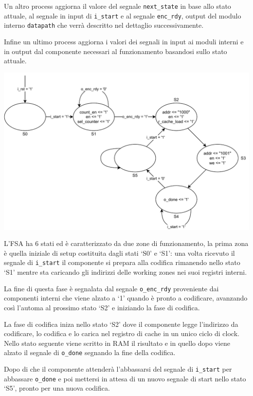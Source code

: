 \documentclass[a4paper,twocolumn]{article}
\begin{document}
Un altro process aggiorna il valore del segnale \texttt{next\_state} in base allo stato attuale, al segnale in input di \texttt{i\_start} e al segnale \texttt{enc\_rdy}, output del modulo interno \texttt{datapath} che verrà descritto nel dettaglio successivamente.

Infine un ultimo process aggiorna i valori dei segnali in input ai moduli interni e in output dal componente necessari al funzionamento basandosi sullo stato attuale.

\includegraphics[width=\linewidth]{schema-fsa.pdf}

L'FSA ha 6 stati ed è caratterizzato da due zone di funzionamento, la prima zona è quella iniziale di setup costituita dagli stati `S0' e `S1': una volta ricevuto il segnale di \texttt{i\_start} il componente si prepara alla codifica rimanendo nello stato `S1' mentre sta caricando gli indirizzi delle working zones nei suoi registri interni.

La fine di questa fase è segnalata dal segnale \texttt{o\_enc\_rdy} proveniente dai componenti interni che viene alzato a `1' quando è pronto a codificare, avanzando così l'automa al prossimo stato `S2' e iniziando la fase di codifica.

La fase di codifica iniza nello stato `S2' dove il componente legge l'indirizzo da codificare, lo codifica e lo carica nel registro di cache in un unico ciclo di clock. Nello stato seguente viene scritto in RAM il risultato e in quello dopo viene alzato il segnale di \texttt{o\_done} segnando la fine della codifica.

Dopo di che il componente attenderà l'abbassarsi del segnale di \texttt{i\_start} per abbassare \texttt{o\_done} e poi mettersi in attesa di un nuovo segnale di start nello stato `S5', pronto per una nuova codifica.
\end{document}
